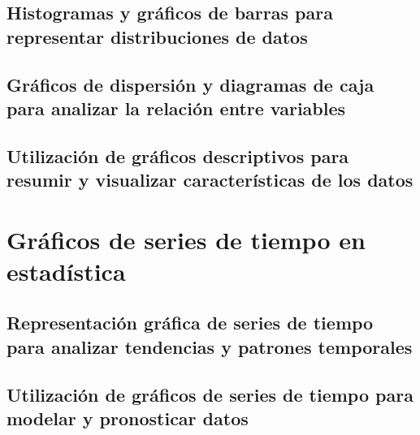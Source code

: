 \documentclass[
  a4paper,
]{article}
\begin{document}
\hypertarget{histogramas-y-gruxe1ficos-de-barras-para-representar-distribuciones-de-datos}{%
\subsection{Histogramas y gráficos de barras para representar
distribuciones de
datos}\label{histogramas-y-gruxe1ficos-de-barras-para-representar-distribuciones-de-datos}}

\hypertarget{gruxe1ficos-de-dispersiuxf3n-y-diagramas-de-caja-para-analizar-la-relaciuxf3n-entre-variables}{%
\subsection{Gráficos de dispersión y diagramas de caja para analizar la
relación entre
variables}\label{gruxe1ficos-de-dispersiuxf3n-y-diagramas-de-caja-para-analizar-la-relaciuxf3n-entre-variables}}

\hypertarget{utilizaciuxf3n-de-gruxe1ficos-descriptivos-para-resumir-y-visualizar-caracteruxedsticas-de-los-datos}{%
\subsection{Utilización de gráficos descriptivos para resumir y
visualizar características de los
datos}\label{utilizaciuxf3n-de-gruxe1ficos-descriptivos-para-resumir-y-visualizar-caracteruxedsticas-de-los-datos}}

\hypertarget{gruxe1ficos-de-series-de-tiempo-en-estaduxedstica}{%
\section{Gráficos de series de tiempo en
estadística}\label{gruxe1ficos-de-series-de-tiempo-en-estaduxedstica}}

\hypertarget{representaciuxf3n-gruxe1fica-de-series-de-tiempo-para-analizar-tendencias-y-patrones-temporales}{%
\subsection{Representación gráfica de series de tiempo para analizar
tendencias y patrones
temporales}\label{representaciuxf3n-gruxe1fica-de-series-de-tiempo-para-analizar-tendencias-y-patrones-temporales}}

\hypertarget{utilizaciuxf3n-de-gruxe1ficos-de-series-de-tiempo-para-modelar-y-pronosticar-datos}{%
\subsection{Utilización de gráficos de series de tiempo para modelar y
pronosticar
datos}\label{utilizaciuxf3n-de-gruxe1ficos-de-series-de-tiempo-para-modelar-y-pronosticar-datos}}
\end{document}
